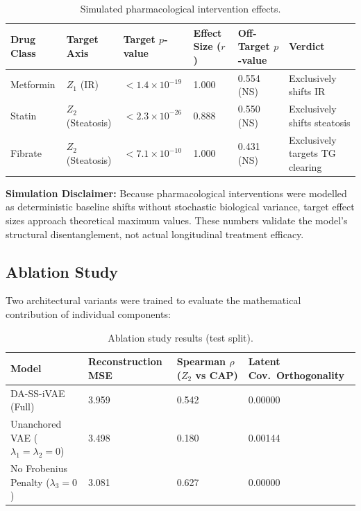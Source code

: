 \documentclass[12pt,a4paper,oneside]{report}
\begin{document}
\begin{table}[H]
\centering
\caption{Simulated pharmacological intervention effects.}
\label{tab:pharma}
\begin{tabular}{@{}llllll@{}}
\toprule
\textbf{Drug Class} & \textbf{Target Axis} & \textbf{Target $p$-value} & \textbf{Effect Size ($r$)} & \textbf{Off-Target $p$-value} & \textbf{Verdict} \\ \midrule
Metformin & $Z_1$ (IR) & $< 1.4 \times 10^{-19}$ & 1.000 & 0.554 (NS) & Exclusively shifts IR \\
Statin    & $Z_2$ (Steatosis) & $< 2.3 \times 10^{-26}$ & 0.888 & 0.550 (NS) & Exclusively shifts steatosis \\
Fibrate   & $Z_2$ (Steatosis) & $< 7.1 \times 10^{-10}$ & 1.000 & 0.431 (NS) & Exclusively targets TG clearing \\ \bottomrule
\end{tabular}
\end{table}

\textbf{Simulation Disclaimer:} Because pharmacological interventions were modelled as deterministic baseline shifts without stochastic biological variance, target effect sizes approach theoretical maximum values. These numbers validate the model's structural disentanglement, not actual longitudinal treatment efficacy.

\subsection{Ablation Study}

Two architectural variants were trained to evaluate the mathematical contribution of individual components:

\begin{table}[H]
\centering
\caption{Ablation study results (test split).}
\label{tab:ablation}
\begin{tabular}{@{}llll@{}}
\toprule
\textbf{Model} & \textbf{Reconstruction MSE} & \textbf{Spearman $\rho$ ($Z_2$ vs CAP)} & \textbf{Latent Cov.\ Orthogonality} \\ \midrule
DA-SS-iVAE (Full)                & 3.959 & 0.542 & 0.00000 \\
Unanchored VAE ($\lambda_1=\lambda_2=0$) & 3.498 & 0.180 & 0.00144 \\
No Frobenius Penalty ($\lambda_3=0$)    & 3.081 & 0.627 & 0.00000 \\ \bottomrule
\end{tabular}
\end{table}
\end{document}
